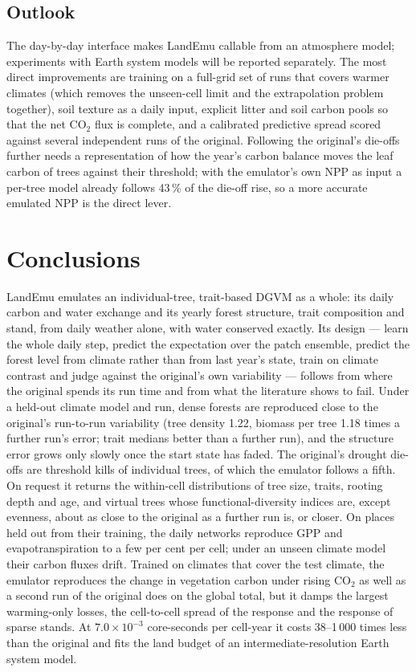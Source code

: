 \documentclass[11pt,a4paper]{article}
\begin{document}
\subsection{Outlook}

The day-by-day interface makes LandEmu callable from an atmosphere model; experiments with Earth system models will be
reported separately. The most direct improvements are training on a full-grid set of runs that covers warmer climates
(which removes the unseen-cell limit and the extrapolation problem together), soil texture as a daily input, explicit
litter and soil carbon pools so that the net CO$_2$ flux is complete, and a calibrated predictive spread scored against
several independent runs of the original. Following the original's die-offs further needs a representation of how the
year's carbon balance moves the leaf carbon of trees against their threshold; with the emulator's own NPP as input a
per-tree model already follows 43\,\% of the die-off rise, so a more accurate emulated NPP is the direct lever.

\section{Conclusions}\label{sec:concl}

LandEmu emulates an individual-tree, trait-based DGVM as a whole: its daily carbon and water exchange and its yearly
forest structure, trait composition and stand, from daily weather alone, with water conserved exactly. Its design ---
learn the whole daily step, predict the expectation over the patch ensemble, predict the forest level from climate
rather than from last year's state, train on climate contrast and judge against the original's own variability ---
follows from where the original spends its run time and from what the literature shows to fail. Under a held-out
climate model and run, dense forests are reproduced close to the original's run-to-run variability (tree density 1.22,
biomass per tree 1.18 times a further run's error; trait medians better than a further run), and the structure error
grows only slowly once the start state has faded. The original's drought die-offs are threshold kills of individual
trees, of which the emulator follows a fifth. On request it returns the within-cell distributions of tree size,
traits, rooting depth and age, and virtual trees whose functional-diversity indices are, except evenness, about as close
to the original as a further run is, or closer. On places held out from their training, the daily networks reproduce GPP
and evapotranspiration to a few per cent per cell; under an unseen climate model their carbon fluxes drift. Trained on
climates that cover the test climate, the emulator reproduces the change in vegetation carbon under rising CO$_2$ as
well as a second run of the original does on the global total, but it damps the largest warming-only losses, the
cell-to-cell spread of the response and the response of sparse stands. At $7.0\times10^{-3}$ core-seconds per
cell-year it costs 38--1\,000 times less than the original and fits the land budget of an intermediate-resolution Earth
system model.
\end{document}
